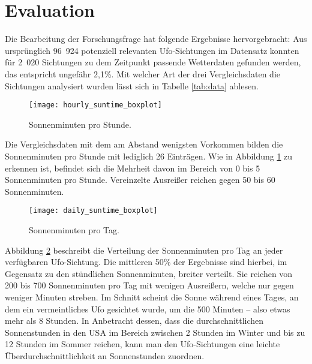 \section{Evaluation} \label{evaluation}

Die Bearbeitung der Forschungsfrage hat folgende Ergebnisse hervorgebracht: Aus ursprünglich 96~924 potenziell relevanten Ufo-Sichtungen im Datensatz konnten für 2~020 Sichtungen zu dem Zeitpunkt passende Wetterdaten gefunden werden, das entspricht ungefähr 2,1\%. Mit welcher Art der drei Vergleichsdaten die Sichtungen analysiert wurden lässt sich in Tabelle \ref{tab:data} ablesen.

\begin{figure}[t]
    \centering
    \texttt{[image: hourly\_suntime\_boxplot]}
    \caption{Sonnenminuten pro Stunde.}
    \label{fig:hourly_suntime}
\end{figure}

Die Vergleichsdaten mit dem am Abstand wenigsten Vorkommen bilden die Sonnenminuten pro Stunde mit lediglich 26 Einträgen. Wie in Abbildung \ref{fig:hourly_suntime} zu erkennen ist, befindet sich die Mehrheit davon im Bereich von 0 bis 5 Sonnenminuten pro Stunde. Vereinzelte Ausreißer reichen gegen 50 bis 60 Sonnenminuten.%

\begin{figure}[t]
    \centering
    \texttt{[image: daily\_suntime\_boxplot]}
    \caption{Sonnenminuten pro Tag.}
    \label{fig:daily_suntime}
\end{figure}

Abbildung \ref{fig:daily_suntime} beschreibt die Verteilung der Sonnenminuten pro Tag an jeder verfügbaren Ufo-Sichtung. Die mittleren 50\% der Ergebnisse sind hierbei, im Gegensatz zu den stündlichen Sonnenminuten, breiter verteilt. Sie reichen von 200 bis 700 Sonnenminuten pro Tag mit wenigen Ausreißern, welche nur gegen weniger Minuten streben. Im Schnitt scheint die Sonne während eines Tages, an dem ein vermeintliches Ufo gesichtet wurde, um die 500 Minuten -- also etwas mehr als 8 Stunden. In Anbetracht dessen, dass die durchschnittlichen Sonnenstunden in den USA im Bereich zwischen 2 Stunden im Winter und bis zu 12 Stunden im Sommer reichen, kann man den Ufo-Sichtungen eine leichte Überdurchschnittlichkeit an Sonnenstunden zuordnen\cite{statista:2021}.


